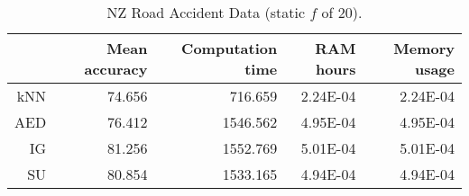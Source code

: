 \begin{table}[h]
\centering
\begin{tabular}{r|rrrr}	
    & Mean accuracy & Computation time & RAM hours & Memory usage \\ \hline
kNN & 74.656                   & 716.659         & 2.24E-04  & 2.24E-04     \\
AED & 76.412                   & 1546.562         & 4.95E-04  & 4.95E-04     \\
IG  & 81.256                   & 1552.769         & 5.01E-04  & 5.01E-04     \\
SU  & 80.854                   & 1533.165         & 4.94E-04  & 4.94E-04   
\end{tabular}
\caption{NZ Road Accident Data (static $f$ of 20).}
\label{Table:NZRoad20}
\end{table}